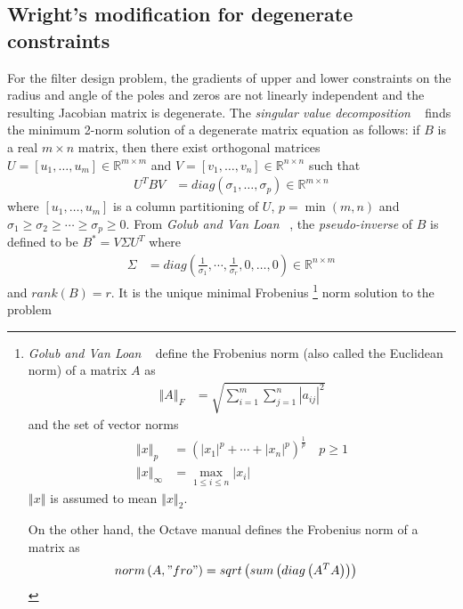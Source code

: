 \documentclass[a4paper,twoside,10pt,english]{report}
\begin{document}
\subsection{\label{sub:Degenerate-constraints}Wright's modification for degenerate constraints}
For the filter design problem, the gradients of upper and lower constraints
on the radius and angle of the poles and zeros are not linearly independent
and the resulting Jacobian matrix is degenerate. The \emph{singular
value decomposition} 
~\cite[Sections 2.5.3 and 5.5]{GolubVanLoan_MatrixComputations}
finds the minimum 2-norm solution of a degenerate matrix equation
as follows: if $B$ is a real $m\times n$ matrix, then there exist
orthogonal matrices $U=\left[u_{1},\ldots,u_{m}\right]\in\mathbb{R}^{m\times m}$
and $V=\left[v_{1},\ldots,v_{n}\right]\in\mathbb{R}^{n\times n}$
such that 
\begin{align*}
U^{T}BV &= diag\left(\sigma_{1},\ldots,\sigma_{p}\right)\in\mathbb{R}^{m\times n}
\end{align*}
where $\left[u_{1},\ldots,u_{m}\right]$ is a column partitioning of
$U$, $p=\min\left(m,n\right)$ and $\sigma_{1}\ge\sigma_{2}\ge\cdots\ge\sigma_{p}\ge0$.
From \emph{Golub and Van Loan}
~\cite[Section 5.5.4]{GolubVanLoan_MatrixComputations},
the \emph{pseudo-inverse} of $B$ is defined to be $B^{*}=V\Sigma U^{T}$
where 
\begin{align*}
\Sigma &= diag\left(\frac{1}{\sigma_{1}},\cdots,\frac{1}{\sigma_{r}},0,\ldots,0\right)\in\mathbb{R}^{n\times m}
\end{align*}
 and $rank\left(B\right)=r$. It is the unique minimal Frobenius
\footnote{\emph{Golub and Van Loan} 
~\cite[Section 2.3.1, Section 2,2,1]{GolubVanLoan_MatrixComputations}
define the Frobenius norm (also called the Euclidean norm) of a matrix
$A$ as
\begin{align*}
\left\Vert A\right\Vert _{F} &= \sqrt{\sum_{i=1}^{m}\sum_{j=1}^{n}\left|a_{ij}\right|^{2}}
\end{align*}
and the set of vector norms
\begin{align*}
\left\Vert x\right\Vert _{p} &= \left(\left|x_{1}\right|^{p}+\cdots+\left|x_{n}\right|^{p}\right)^{\frac{1}{p}}\quad p\ge1\\
\left\Vert x\right\Vert _{\infty} &= \max_{1\le i\le n}\left|x_{i}\right|
\end{align*}
$\left\Vert x\right\Vert $ is assumed to mean $\left\Vert x\right\Vert _{2}$. 

On the other hand, the Octave manual defines the Frobenius
norm of a matrix as
\begin{align*}
norm\left(A,"fro"\right) &= sqrt\left(sum\left(diag\left(A^{T}A\right)\right)\right)
\end{align*}
%
} norm solution to the problem 
\end{document}
